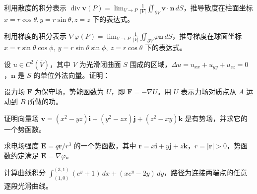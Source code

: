 \noindent\begin{minipage}{\textwidth}
利用散度的积分表示 $\displaystyle\operatorname{div}\boldsymbol v(P)=\lim_{V\to P}\frac1{|V|}\iint_{\partial V}\boldsymbol v\cdot\boldsymbol n\,dS$，推导散度在柱面坐标 $x=r\cos\theta,y=r\sin\theta,z=z$ 下的表达式。
\end{minipage}\par\vfill
\newpage
\noindent\begin{minipage}{\textwidth}
利用梯度的积分表示 $\displaystyle\nabla\varphi(P)=\lim_{V\to P}\frac1{|V|}\iint_{\partial V}\varphi\boldsymbol n\,dS$，推导梯度在球面坐标 $x=r\sin\theta\cos\phi,\ y=r\sin\theta\sin\phi,\ z=r\cos\theta$ 下的表达式。
\end{minipage}\par\vfill
\noindent\begin{minipage}{\textwidth}
设 $u\in C^2(\overline V)$，其中 $V$ 为光滑闭曲面 $S$ 围成的区域，$\Delta u=u_{xx}+u_{yy}+u_{zz}=0$，$\boldsymbol n$ 是 $S$ 的单位外法向量。证明：
\end{minipage}\par\vfill
\noindent\begin{minipage}{\textwidth}
设力场 $\boldsymbol F$ 为保守场，势能函数为 $U$，即 $\boldsymbol F=-\nabla U$。用 $U$ 表示力场对质点从 $A$ 运动到 $B$ 所做的功。
\end{minipage}\par\vfill
\noindent\begin{minipage}{\textwidth}
证明向量场 $\boldsymbol v=(x^2-yz)\boldsymbol i+(y^2-zx)\boldsymbol j+(z^2-xy)\boldsymbol k$ 是有势场，并求它的一个势函数。
\end{minipage}\par\vfill
\newpage
\noindent\begin{minipage}{\textwidth}
求电场强度 $\boldsymbol E=q\boldsymbol r/r^3$ 的一个势函数，其中 $\boldsymbol r=x\boldsymbol i+y\boldsymbol j+z\boldsymbol k$，$r=|\boldsymbol r|>0$，势函数约定满足 $\boldsymbol E=\nabla\varphi$。
\end{minipage}\par\vfill
\noindent\begin{minipage}{\textwidth}
计算曲线积分 $\displaystyle\int_{(1,0)}^{(3,1)}(e^y+1)\,dx+(xe^y-2y)\,dy$，路径为连接两端点的任意逐段光滑曲线。
\end{minipage}\par\vfill
